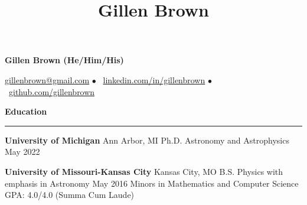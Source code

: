 \documentclass[10pt]{article}
\title{Gillen Brown}
\newcommand{\todo}[1]{\textcolor{red}{[\bf #1]}}
\newcommand{\spacer}{$\bullet$ \ }
\newcommand{\header}[1]{\vspace{1.0em}\par \textbf{\large #1}\strut\hrule\vspace{-0.9em}}
\newcommand{\actionHeader}[2]{\vspace{0.6em}\textbf{#1} \hfill #2}
\newcommand{\indentedItemDate}[2]{\newline\null\qquad #1 \hfill #2}
\newcommand{\indentedItem}[1]{\newline\null\qquad #1}
\begin{document}
\thispagestyle{empty}


\begin{center}
{\LARGE \bf Gillen Brown (He/Him/His)}

{\normalsize \href{mailto:gillenbrown@gmail.com}{gillenbrown@gmail.com} \spacer \href{http://www.linkedin.com/in/gillenbrown}{linkedin.com/in/gillenbrown} \spacer \href{http://www.github.com/gillenbrown}{github.com/gillenbrown}}
\end{center}



\header{Education}
\actionHeader{University of Michigan}{Ann Arbor, MI}
\indentedItemDate{Ph.D. Astronomy and Astrophysics}{May 2022}
\vspace{-0.5em}

\actionHeader{University of Missouri-Kansas City}{Kansas City, MO}
\indentedItemDate{B.S. Physics with emphasis in Astronomy}{May 2016}
\indentedItem{Minors in Mathematics and Computer Science}
\indentedItem{GPA: 4.0/4.0  (Summa Cum Laude)}
\vspace{-0.3em}
\end{document}
